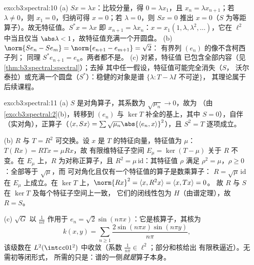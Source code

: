 \begin{solution}{exo:b3:spectral:10}
(a) $Sx = \lambda x$：比较分量，得 $0 = \lambda
x_1$，且 $x_n = \lambda x_{n+1}$；若 $\lambda \ne 0$，则
$x_1 = 0$，归纳可得 $x = 0$；若 $\lambda = 0$，则 $Sx = 0$
推出 $x = 0$（$S$ 为等距算子）。故无特征值。$S^*x =
\lambda x$ 即 $x_{n+1} = \lambda x_n$：$x =
x_1(1, \lambda, \lambda^2, \dots)$，它在 $\ell^2$ 中当且仅当
$\abs\lambda < 1$，故特征值充满一个开圆盘。
(b) $\norm{Se_n - Se_m} = \norm{e_{n+1} - e_{m+1}} = \sqrt2$：
有界列 $(e_n)$ 的像不含柯西子列；
同理 $S^*e_{n+1} = e_n$。两者都不是。
(c) 对紧，特征值
已包含全部内容（见\cref{thm:b3:spectral:spectral}）；去掉
其中任一假设，特征值可能完全消失（$S$，
沃尔泰拉）或充满一个圆盘（$S^*$）：稳健的对象是谱
$\{\lambda : T - \lambda I \text{ 不可逆}\}$，
其理论属于后续课程。
\end{solution}

\begin{solution}{exo:b3:spectral:11}
(a) $S$ 是对角算子，其系数为
$\sqrt{\mu_n} \to 0$，故为
（由\cref{exo:b3:spectral:2}(b)，转移到
$(e_n)$ 与 $\ker T$ 补全的基上，其中 $S = 0$），自伴
（实对角），正算子（$\langle x, Sx\rangle =
\sum\sqrt{\mu_n}\abs{\langle e_n, x\rangle}^2$），且 $S^2 =
T$ 逐项成立。

(b) $R$ 与 $T = R^2$ 可交换。设 $x$ 是
$T$ 的特征向量，特征值为 $\mu$：$T(Rx) = RTx = \mu Rx$，故
有限维特征子空间 $E_\mu = \ker(T - \mu)$ 关于
$R$ 不变。在 $E_\mu$ 上，$R$ 为对称正算子，且 $R^2
= \mu\,\mathrm{id}$：其特征值 $\rho$ 满足 $\rho^2
= \mu$，$\rho \geq 0$：全部等于 $\sqrt\mu$，而
可对角化且仅有一个特征值的算子是数乘算子：
$R = \sqrt\mu\,\mathrm{id}$ 在 $E_\mu$ 上成立。在 $\ker T$ 上，$\norm
{Rx}^2 = \langle x, R^2x\rangle = \langle x, Tx\rangle = 0$。
故 $R$ 与 $S$ 在 $\ker T$ 及每个特征子空间上一致，
它们的闭线性包为 $H$（由谱定理），故 $R = S$。

(c) $\sqrt G$ 以 $\frac1{n\pi}$ 作用于 $e_n =
\sqrt2\sin(n\pi x)$：它是核算子，其核为
\[
k(x, y) = \sum_{n\geq1}\frac{2\sin(n\pi x)\sin(n\pi
y)}{n\pi},
\]
该级数在 $L^2(\intcc01^2)$ 中收敛（系数
$\frac1{n\pi} \in \ell^2$；部分和核给出
有限秩逼近）。无需初等闭形式，
所需的只是：谱的一侧\emph{就是}算子本身。
\end{solution}

